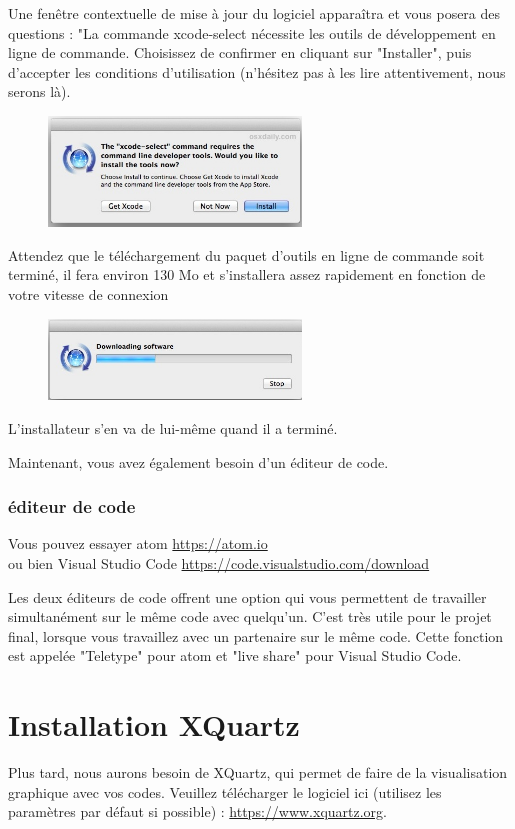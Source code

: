\documentclass{article}
\begin{document}
Une fenêtre contextuelle de mise à jour du logiciel apparaîtra et vous posera des questions : "La commande xcode-select nécessite les outils de développement en ligne de commande. Choisissez de confirmer en cliquant sur "Installer", puis d'accepter les conditions d'utilisation (n'hésitez pas à les lire attentivement, nous serons là).
\begin{figure}[H]
\center
\includegraphics[width=0.6\textwidth]{Plots/confirm-install-command-line-tools-mac-os-x.jpg}
\end{figure}
Attendez que le téléchargement du paquet d'outils en ligne de commande soit terminé, il fera environ 130 Mo et s'installera assez rapidement en fonction de votre vitesse de connexion
\begin{figure}[H]
\center
\includegraphics[width=0.6\textwidth]{Plots/downloading-command-line-tools.jpg}
\end{figure}
L'installateur s'en va de lui-même quand il a terminé.

Maintenant, vous avez également besoin d'un éditeur de code.
\subsubsection{éditeur de code\label{S:VisCodAtom}}
Vous pouvez essayer atom \href{https://atom.io}{https://atom.io}\\
ou bien Visual Studio Code \href{https://code.visualstudio.com/download}{https://code.visualstudio.com/download}

Les deux éditeurs de code offrent une option qui vous permettent de travailler simultanément sur le même code avec quelqu'un. C'est très utile pour le projet final, lorsque vous travaillez avec un partenaire sur le même code. Cette fonction est appelée "Teletype" pour atom et "live share" pour Visual Studio Code. 

\section{Installation XQuartz \label{S:InstallXquatz}}
Plus tard, nous aurons besoin de XQuartz, qui permet de faire de la visualisation graphique avec vos codes.
Veuillez télécharger le logiciel ici (utilisez les paramètres par défaut si possible) : \href{https://www.xquartz.org}{https://www.xquartz.org}.
\end{document}
